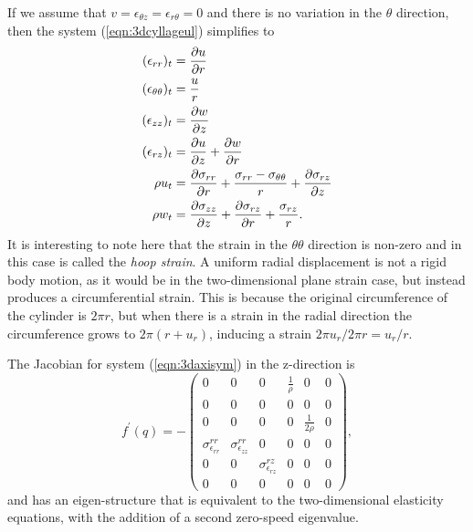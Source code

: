 \documentclass{article}
\begin{document}
If we assume that $v = \epsilon_{\theta z} = \epsilon_{r \theta} = 0$ and there is no variation in the $\theta
$ direction, then the system (\ref{eqn:3dcyllageul}) simplifies to
\begin{align}
(\epsilon_{rr})_t &= \frac{\partial u}{\partial r}\notag\\
(\epsilon_{\theta \theta})_t &= \frac{u}{r} \notag\\
(\epsilon_{zz})_t &= \frac{\partial w}{\partial z}\notag\\
(\epsilon_{rz})_t &= \frac{\partial u}{\partial z} + \frac{\partial w}{\partial r}\label{eqn:3daxisym}\\
\rho u_t &= \frac{\partial \sigma_{rr}}{\partial r} + \frac{\sigma_{rr} - \sigma_{\theta \theta}}{r} + \frac{\partial 
\sigma_{rz}}{\partial z}\notag\\
\rho w_t &= \frac{\partial \sigma_{zz}}{\partial z} + \frac{\partial \sigma_{rz}}{\partial r} + \frac{\sigma_{rz}}
{r}.\notag\\
\end{align}
It is interesting to note here that the strain in the $\theta \theta$ direction is non-zero and in this case is 
called the {\it hoop strain}.  A uniform radial displacement is not a rigid body motion, as it would be in the 
two-dimensional plane strain case, but instead produces a circumferential strain.  This is because the 
original circumference of the cylinder is $2\pi r$, but when there is a strain in the radial direction the 
circumference grows to $2\pi (r + u_r)$, inducing a strain $2\pi u_r / 2 \pi r = u_r/r$.  


The Jacobian for system (\ref{eqn:3daxisym}) in the z-direction is
\begin{equation}
f^{\prime}(q) = -\left(
\begin{array}{cccccc} 0&0&0&\frac{1}{\rho}&0&0 \\ 0&0&0&0&0&0 \\ 0&0&0&0&\frac{1}{2\rho}&0 \\ 
\sigma^{rr}_{\epsilon_{rr}}&\sigma^{rr}_{\epsilon_{zz}}&0&0&0&0\\ 0&0&
\sigma^{rz}_{\epsilon_{rz}}&0&0&0 \\ 0&0&0&0&0&0
\end{array}
\right), 
\end{equation}
and has an eigen-structure that is equivalent to the two-dimensional elasticity equations, with the 
addition of a second zero-speed eigenvalue.  

\end{document}
